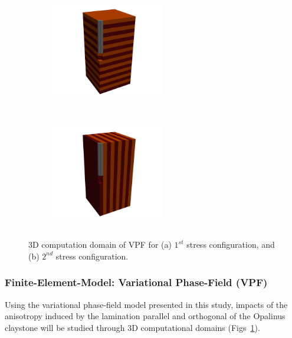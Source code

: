 \begin{figure}[!ht]
\begin{subfigure}[c]{0.48\textwidth}
\centering
\includegraphics[width=5cm,height=5cm]{figures/ME2b_init_para.png}
\subcaption{}
\end{subfigure}
\hfill
\begin{subfigure}[c]{0.48\textwidth}
\centering
\includegraphics[width=5cm,height=5cm]{figures/ME2b_init_orth.png}
\subcaption{}
\end{subfigure}
\caption{3D computation domain of VPF for (a) $1^{st}$ stress configuration, and (b) $2^{nd}$ stress configuration.}
\label{fig:VPF_ME2_B_init}
\end{figure}

\subsubsection*{Finite-Element-Model: Variational Phase-Field (VPF)}
Using the variational phase-field model presented in this study, impacts of the anisotropy induced by the lamination parallel and orthogonal of the Opalinus claystone will be studied through 3D computational domains (Figs~\ref{fig:VPF_ME2_B_init}).
